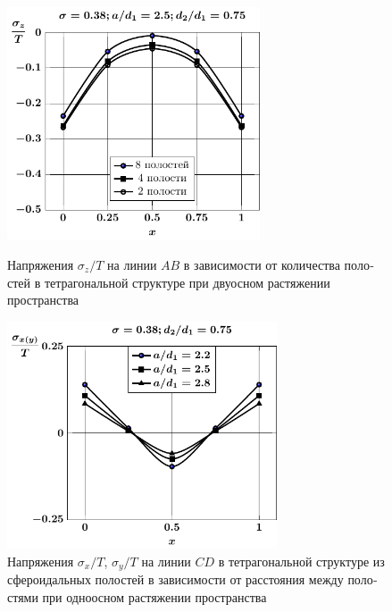 \begin{russian}
%

\begin{figure}[h!]
\centering\footnotesize
\parbox[b]{7.5cm}{\centering\includegraphics[width=7.5cm]{cav8-4-2-sig_z-spheroids-tension2.pdf}
\caption{Напряжения $\sigma_z/T$ на линии $AB$ в зависимости от количества полостей в тетрагональной структуре при двуосном растяжении пространства
\label{f:9:13}}}\hfil\hfil
\parbox[b]{7.5cm}{\centering\includegraphics[width=8cm]{cav8-a-d75-t1-sig_x-cd.pdf}
\caption{Напряжения $\sigma_x/T$, $\sigma_y/T$ на линии $CD$ в тетрагональной структуре из сфероидальных полостей в зависимости от расстояния между полостями при одноосном растяжении пространства
\label{f:9:14}}}
\end{figure}


\end{russian}
